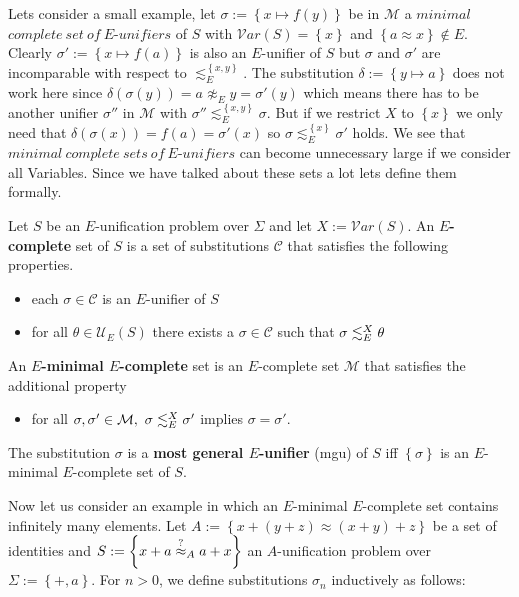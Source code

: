 Lets consider a small example, let $\sigma:=\left\lbrace x\mapsto f(y)\right\rbrace$ be in $\mathcal{M}$ a $minimal$ $complete\ set\ of\ E$-$unifiers$ of $S$ with $\mathcal{V}ar(S)=\left\lbrace x\right\rbrace$ and $\left\lbrace a\approx x\right\rbrace \notin E$. Clearly $\sigma':=\left\lbrace x\mapsto f(a)\right\rbrace$ is also an $E$-unifier of $S$ but $\sigma$ and $\sigma'$ are incomparable with respect to $\lesssim^{\left\lbrace x,y\right\rbrace }_E$. The substitution $\delta:=\left\lbrace y\mapsto a\right\rbrace $ does not work here since $\delta(\sigma(y))=a \not\approx_E y=\sigma'(y)$ which means there has to be another unifier $\sigma''$ in $\mathcal{M}$ with $\sigma''\lesssim^{\left\lbrace x,y\right\rbrace }_E\sigma$. But if we restrict $X$ to $\left\lbrace x\right\rbrace $ we only need that $\delta(\sigma(x))=f(a)=\sigma'(x)$ so $\sigma\lesssim^{\left\lbrace x\right\rbrace }_E\sigma'$ holds. We see that $minimal\ complete\ sets\ of\ E$-$unifiers$ can become unnecessary large if we consider all Variables. Since we have talked about these sets a lot lets define them formally.
\begin{definition}
	Let $S$ be an $E$-unification problem over $\Sigma$ and let $X:=\mathcal{V}ar(S)$. An \textbf{$E$-complete} set of $S$ is a set of substitutions $\mathcal{C}$ that satisfies the following properties.
	\begin{itemize}
		\item each $\sigma \in \mathcal{C}$ is an $E$-unifier of $S$
		\item for all $\theta \in\mathcal{U}_E(S)$ there exists a $\sigma \in \mathcal{C}$ such that $\sigma\lesssim^X_E\theta$
	\end{itemize}
	An \textbf{$E$-minimal $E$-complete} set is an $E$-complete set  $\mathcal{M}$ that satisfies the additional property
	\begin{itemize}
		\item for all $\sigma,\sigma'\in\mathcal{M},\ \sigma\moreGeneral\sigma'$ implies $\sigma=\sigma'$.
	\end{itemize}
	The substitution $\sigma$ is a \textbf{most general $E$-unifier} (mgu) of $S$ iff $\left\lbrace \sigma\right\rbrace$ is an $E$-minimal $E$-complete set of $S$.
\end{definition}
Now let us consider an example in which an $E$-minimal $E$-complete set contains infinitely many elements. Let $A:=\left\lbrace x+(y+z)\approx (x+y)+z\right\rbrace $ be a set of identities and $S:=\left\lbrace x+a\stackrel{?}{\approx}_A a+x\right\rbrace$ an $A$-unification problem over $\Sigma:=\left\lbrace +,a\right\rbrace$. For $n>0$, we define substitutions $\sigma_n$ inductively as follows:
